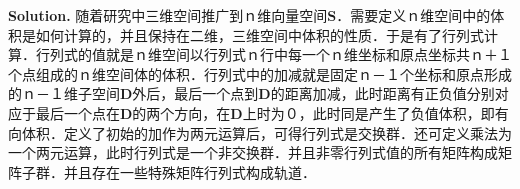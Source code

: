 \documentclass[a4paper]{book}
\newenvironment{solution}%
{\noindent\textbf{Solution.}}%
{\qedhere}
\numberwithin{equation}{chapter}
\theoremstyle{definition}
\begin{document}
\begin{multicols}{2}
\begin{solution}
	随着研究中三维空间推广到ｎ维向量空间$ \mathbf{S} $．需要定义ｎ维空间中的体积是如何计算的，并且保持在二维，三维空间中体积的性质．于是有了行列式计算．行列式的值就是ｎ维空间以行列式ｎ行中每一个ｎ维坐标和原点坐标共ｎ＋１个点组成的ｎ维空间体的体积．行列式中的加减就是固定ｎ－１个坐标和原点形成的ｎ－１维子空间$ \mathbf{D} $外后，最后一个点到$ \mathbf{D} $的距离加减，此时距离有正负值分别对应于最后一个点在$ \mathbf{D} $的两个方向，在$ \mathbf{D} $上时为０，此时同是产生了负值体积，即有向体积．定义了初始的加作为两元运算后，可得行列式是交换群．还可定义乘法为一个两元运算，此时行列式是一个非交换群．并且非零行列式值的所有矩阵构成矩阵子群．并且存在一些特殊矩阵行列式构成轨道．
\end{solution}
%

%


\end{multicols}
\end{document}
